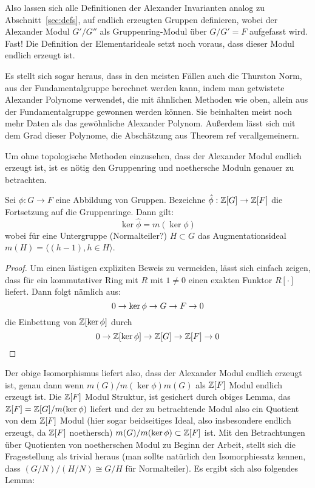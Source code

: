 Also lassen sich alle Definitionen der Alexander Invarianten analog zu Abschnitt~\ref{sec:defs}, auf endlich erzeugten Gruppen definieren, wobei der Alexander Modul $G'/G''$ als Gruppenring-Modul über $G/G'=F$ aufgefasst wird. Fast! Die Definition der Elementarideale setzt noch voraus, dass dieser Modul endlich erzeugt ist.


Es stellt sich sogar heraus, dass in den meisten Fällen auch die Thurston Norm, aus der Fundamentalgruppe berechnet werden kann, indem man getwistete Alexander Polynome verwendet, die mit ähnlichen Methoden wie oben, allein aus der Fundamentalgruppe gewonnen werden können. Sie beinhalten meist noch mehr Daten als das gewöhnliche Alexander Polynom. Außerdem lässt sich mit dem Grad dieser Polynome, die Abschätzung aus Theorem ref verallgemeinern.

Um ohne topologische Methoden einzusehen, dass der Alexander Modul endlich erzeugt ist, ist es nötig den Gruppenring und noethersche Moduln genauer zu betrachten.

\begin{lem}
	Sei $\phi:G \to F$ eine Abbildung von Gruppen. Bezeichne $\hat \phi: \mathbb{Z}[G] \to \mathbb{Z}[F]$ die Fortsetzung auf die Gruppenringe. Dann gilt:
	\[
		\ker\hat\phi = m(\ker\phi)
	\]
	wobei für eine Untergruppe (Normalteiler?) $H\subset G$ das Augmentationsideal $m(H) = \langle(h-1), h \in H\rangle$.
\end{lem}
\begin{proof}
	Um einen lästigen expliziten Beweis zu vermeiden, lässt sich einfach zeigen, dass für ein kommutativer Ring mit $R$ mit $1\neq 0$ einen exakten Funktor $R[\cdot]$ liefert. Dann folgt nämlich aus:
	\[
		0\to\ker\phi\to G\to F\to0
	\]
	die Einbettung von $\mathbb{Z}[\ker\phi]$ durch
	\[
		0\to\mathbb{Z}[\ker\phi]\to\mathbb{Z}[G]\to\mathbb{Z}[F]\to0
	\]
\end{proof}


Der obige Isomorphismus liefert also, dass der Alexander Modul endlich erzeugt ist, genau dann wenn $m(G)/m(\ker\phi)m(G)$ als $\mathbb{Z}[F]$ Modul endlich erzeugt ist. Die $\mathbb{Z}[F]$ Modul Struktur, ist gesichert durch obiges Lemma, das $\mathbb{Z}[F]=\mathbb{Z}[G]/m(\ker\phi)$ liefert und der zu betrachtende Modul also ein Quotient von dem $\mathbb{Z}[F]$ Modul (hier sogar beidseitiges Ideal, also insbesondere endlich erzeugt, da $\mathbb{Z}[F]$ noethersch) $m(G)/m(\ker\phi) \subset \mathbb{Z}[F]$ ist. Mit den Betrachtungen über Quotienten von noetherschen Modul zu Beginn der Arbeit, stellt sich die Fragestellung als trivial heraus (man sollte natürlich den Isomorphiesatz kennen, dass $(G/N)/(H/N)\cong G/H$ für Normalteiler). Es ergibt sich also folgendes Lemma:

